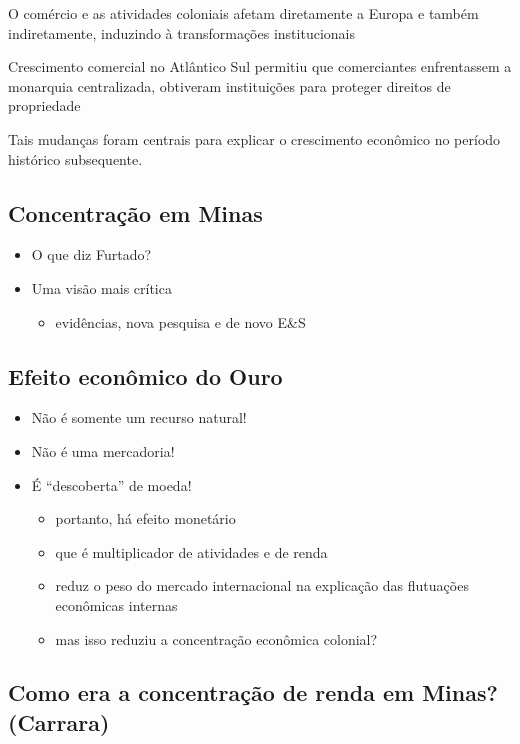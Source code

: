 \documentclass[a4paper,12pt]{article}[abntex2]
\begin{document}
O comércio e as atividades coloniais afetam diretamente a Europa e também indiretamente, induzindo à transformações institucionais

Crescimento comercial no Atlântico Sul permitiu que comerciantes enfrentassem a monarquia centralizada, obtiveram instituições para proteger direitos de propriedade

Tais mudanças foram centrais para explicar o crescimento econômico no período histórico subsequente.

\subsection{\textbf{Concentração em Minas}}
\begin{itemize}
    \item  O que diz Furtado?
    \item  Uma visão mais crítica \begin{itemize}
        \item evidências, nova pesquisa e de novo E\&S
    \end{itemize}
\end{itemize}

\subsection{\textbf{Efeito econômico do Ouro}}

\begin{itemize}
    \item Não é somente um recurso natural!
    \item Não é uma mercadoria!
    \item É “descoberta” de moeda! \begin{itemize}
        \item portanto, há efeito monetário
        \item que é multiplicador de atividades e de renda
        \item reduz o peso do mercado internacional na explicação das flutuações econômicas internas
        \item mas isso reduziu a concentração econômica colonial?
    \end{itemize}
\end{itemize}

\subsection{\textbf{Como era a concentração de renda em Minas? (Carrara)}}
\end{document}
